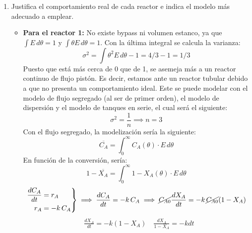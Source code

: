 \begin{enumerate}[label={\alph*)}]
	\item Justifica el comportamiento real de cada reactor e indica el modelo más adecuado a emplear.
	      \begin{itemize}
		      \item \textbf{Para el reactor 1:}
		            No existe bypass ni volumen estanco, ya que $\int E\,d\theta = 1$ y $\int \theta E\,d\theta = 1$. Con la última integral se calcula la varianza:
		            \begin{equation*}
			            \sigma^2 = \int \theta^2 E\,d\theta - 1 = 4/3 -1 = 1/3
		            \end{equation*}
		            Puesto que está más cerca de 0 que de 1, se asemeja más a un reactor continuo de flujo pistón. Es decir, estamos ante un reactor tubular debido a que no presenta un comportamiento ideal. Este se puede modelar con el modelo de flujo segregado (al ser de primer orden), el modelo de dispersión y el modelo de tanques en serie, el cual será el siguiente:
		            \begin{equation*}
			            \sigma^2 = \frac{1}{n} \implies n = 3
		            \end{equation*}
		            Con el flujo segregado, la modelización sería la siguiente:
		            \begin{equation*}
			            \overline{C_A} = \int_{0}^{\infty} C_A(\theta) \cdot E \, d\theta
		            \end{equation*}
		            En función de la conversión, sería:
		            \begin{equation*}
			            1 -\overline{X_A} = \int_{0}^{\infty} 1 - X_A(\theta) \cdot E \, d\theta
		            \end{equation*}
		            \begin{align*}
			            \left.\begin{aligned}
				                  \frac{dC_A}{dt} & = r_A     \\
				                  r_A             & = -k\,C_A
			                  \end{aligned}\right\}
			            \implies \frac{dC_A}{dt} = -k\,C_A
			            \implies \cancel{C_{A0}}\frac{dX_A}{dt} = -k\,\cancel{C_{A0}}(1-X_A)
		            \end{align*}
		            \begin{align*}
			             & \frac{dX_A}{dt}                       = -k(1-X_A)\quad \frac{dX_A}{1-X_A} = -k dt  \\[6pt]

\end{align*}
\end{itemize}
\end{enumerate}

